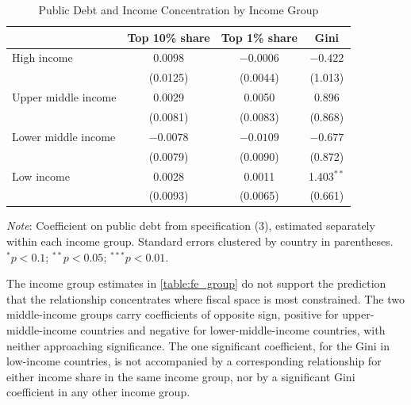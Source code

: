 \documentclass[12pt, titlepage]{article}
\numberwithin{equation}{section}
\begin{document}
\begin{table}[htbp]
	\centering
	\begin{threeparttable}
		\caption{Public Debt and Income Concentration by Income Group}
		\label{table:fe_group}
		\begin{small}
			\begin{tabular}{lccc}
				\toprule
				& Top 10\% share & Top 1\% share & Gini \\
				\midrule
				High income & \phantom{$-$}0.0098\phantom{$^{**}$} & $-0.0006$\phantom{$^{**}$} & $-0.422$\phantom{$^{**}$} \\
				& (0.0125) & (0.0044) & (1.013) \\
				\addlinespace
				Upper middle income & \phantom{$-$}0.0029\phantom{$^{**}$} & \phantom{$-$}0.0050\phantom{$^{**}$} & \phantom{$-$}0.896\phantom{$^{**}$} \\
				& (0.0081) & (0.0083) & (0.868) \\
				\addlinespace
				Lower middle income & $-0.0078$\phantom{$^{**}$} & $-0.0109$\phantom{$^{**}$} & $-0.677$\phantom{$^{**}$} \\
				& (0.0079) & (0.0090) & (0.872) \\
				\addlinespace
				Low income & \phantom{$-$}0.0028\phantom{$^{**}$} & \phantom{$-$}0.0011\phantom{$^{**}$} & \phantom{$-$}1.403$^{**}$ \\
				& (0.0093) & (0.0065) & (0.661) \\
				\bottomrule
			\end{tabular}
		\end{small}
		\begin{tablenotes}
			\footnotesize
			\item \emph{Note}: Coefficient on public debt from specification (3),
			estimated separately within each income group. Standard errors clustered
			by country in parentheses. $^{*}p<0.1$; $^{**}p<0.05$; $^{***}p<0.01$.
		\end{tablenotes}
	\end{threeparttable}
\end{table}

The income group estimates in \autoref{table:fe_group} do not support the
prediction that the relationship concentrates where fiscal space is most
constrained. The two middle-income groups carry coefficients of opposite sign,
positive for upper-middle-income countries and negative for lower-middle-income
countries, with neither approaching significance. The one significant
coefficient, for the Gini in low-income countries, is not accompanied by a
corresponding relationship for either income share in the same income group,
nor by a significant Gini coefficient in any other income group.
\end{document}
